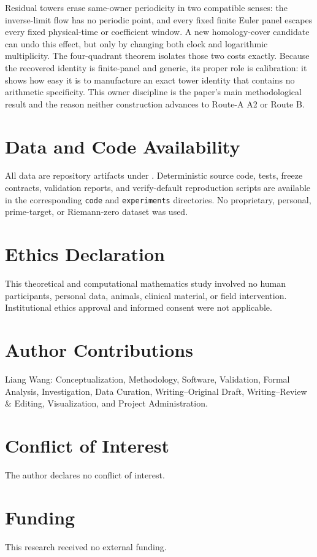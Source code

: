 \documentclass[11pt]{article}
\theoremstyle{definition}
\theoremstyle{remark}
\begin{document}
Residual towers erase same-owner periodicity in two compatible senses: the inverse-limit flow has no periodic point, and every fixed finite Euler panel escapes every fixed physical-time or coefficient window. A new homology-cover candidate can undo this effect, but only by changing both clock and logarithmic multiplicity. The four-quadrant theorem isolates those two costs exactly. Because the recovered identity is finite-panel and generic, its proper role is calibration: it shows how easy it is to manufacture an exact tower identity that contains no arithmetic specificity. This owner discipline is the paper's main methodological result and the reason neither construction advances to Route-A A2 or Route B.

\section*{Data and Code Availability}
All data are repository artifacts under . Deterministic source code, tests, freeze contracts, validation reports, and verify-default reproduction scripts are available in the corresponding \texttt{code} and \texttt{experiments} directories. No proprietary, personal, prime-target, or Riemann-zero dataset was used.

\section*{Ethics Declaration}
This theoretical and computational mathematics study involved no human participants, personal data, animals, clinical material, or field intervention. Institutional ethics approval and informed consent were not applicable.

\section*{Author Contributions}
Liang Wang: Conceptualization, Methodology, Software, Validation, Formal Analysis, Investigation, Data Curation, Writing--Original Draft, Writing--Review \& Editing, Visualization, and Project Administration.

\section*{Conflict of Interest}
The author declares no conflict of interest.

\section*{Funding}
This research received no external funding.
\end{document}
